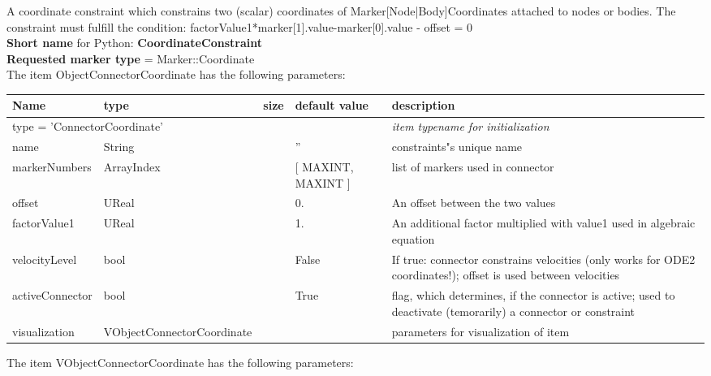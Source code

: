 A coordinate constraint which constrains two (scalar) coordinates of Marker[Node|Body]Coordinates attached to nodes or bodies. The constraint must fulfill the condition: \be factorValue1*marker[1].value-marker[0].value - offset = 0 \ee
 \\
{\bf Short name} for Python: {\bf CoordinateConstraint}
 \\  {\bf Requested marker type} = Marker::Coordinate \\ 
The item ObjectConnectorCoordinate has the following parameters:
\begin{center}
  \footnotesize
  \begin{longtable}{| p{4.5cm} | p{2.5cm} | p{0.5cm} | p{2.5cm} | p{6cm} |}
    \hline
    \bf Name & \bf type & \bf size & \bf default value & \bf description \\ \hline
    \multicolumn{4}{l}{\parbox{10cm}{type = 'ConnectorCoordinate'}} & \multicolumn{1}{l}{\parbox{6cm}{\it item typename for initialization}}\\ \hline
    name &     String &      &     '' &     constraints"s unique name\\ \hline
    markerNumbers &     ArrayIndex &      &     [ MAXINT, MAXINT ] &     list of markers used in connector\\ \hline
    offset &     UReal &      &     0. &     An offset between the two values\\ \hline
    factorValue1 &     UReal &      &     1. &     An additional factor multiplied with value1 used in algebraic equation\\ \hline
    velocityLevel &     bool &      &     False &     If true: connector constrains velocities (only works for ODE2 coordinates!); offset is used between velocities\\ \hline
    activeConnector &     bool &      &     True &     flag, which determines, if the connector is active; used to deactivate (temorarily) a connector or constraint\\ \hline
    visualization & VObjectConnectorCoordinate & & & parameters for visualization of item \\ \hline
	  \end{longtable}
	\end{center}
The item VObjectConnectorCoordinate has the following parameters:
